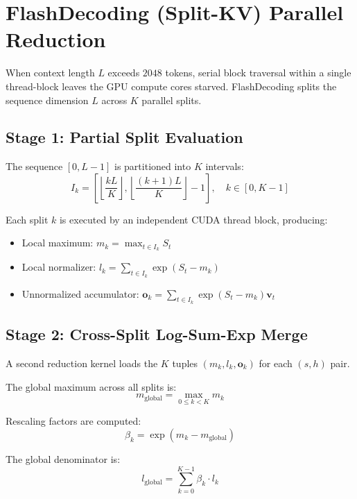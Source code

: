 \documentclass[11pt,a4paper]{article}
\begin{document}
\section{FlashDecoding (Split-KV) Parallel Reduction}

When context length $L$ exceeds $2048$ tokens, serial block traversal within a single thread-block leaves the GPU compute cores starved. FlashDecoding splits the sequence dimension $L$ across $K$ parallel splits.

\subsection{Stage 1: Partial Split Evaluation}
The sequence $[0, L-1]$ is partitioned into $K$ intervals:
\begin{equation}
I_k = \left[ \left\lfloor \frac{k L}{K} \right\rfloor, \left\lfloor \frac{(k+1) L}{K} \right\rfloor - 1 \right], \quad k \in [0, K-1]
\end{equation}

Each split $k$ is executed by an independent CUDA thread block, producing:
\begin{itemize}
    \item Local maximum: $m_k = \max_{t \in I_k} S_t$
    \item Local normalizer: $l_k = \sum_{t \in I_k} \exp(S_t - m_k)$
    \item Unnormalized accumulator: $\mathbf{o}_k = \sum_{t \in I_k} \exp(S_t - m_k) \mathbf{v}_t$
\end{itemize}

\subsection{Stage 2: Cross-Split Log-Sum-Exp Merge}
A second reduction kernel loads the $K$ tuples $(m_k, l_k, \mathbf{o}_k)$ for each $(s, h)$ pair.

The global maximum across all splits is:
\begin{equation}
m_{\text{global}} = \max_{0 \le k < K} m_k
\end{equation}

Rescaling factors are computed:
\begin{equation}
\beta_k = \exp(m_k - m_{\text{global}})
\end{equation}

The global denominator is:
\begin{equation}
l_{\text{global}} = \sum_{k=0}^{K-1} \beta_k \cdot l_k
\end{equation}
\end{document}
